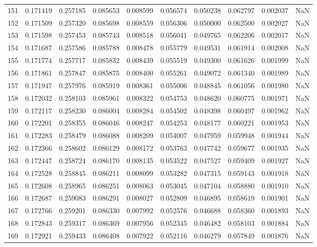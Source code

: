 \begin{tabular}{lrrrrrrrrr}
151 & 0.171419 & 0.257185 & 0.085653 & 0.008599 & 0.056574 & 0.050238 & 0.062797 & 0.002037 & NaN \\
152 & 0.171509 & 0.257320 & 0.085698 & 0.008559 & 0.056306 & 0.050000 & 0.062500 & 0.002027 & NaN \\
153 & 0.171598 & 0.257453 & 0.085743 & 0.008518 & 0.056041 & 0.049765 & 0.062206 & 0.002017 & NaN \\
154 & 0.171687 & 0.257586 & 0.085788 & 0.008478 & 0.055779 & 0.049531 & 0.061914 & 0.002008 & NaN \\
155 & 0.171774 & 0.257717 & 0.085832 & 0.008439 & 0.055519 & 0.049300 & 0.061626 & 0.001999 & NaN \\
156 & 0.171861 & 0.257847 & 0.085875 & 0.008400 & 0.055261 & 0.049072 & 0.061340 & 0.001989 & NaN \\
157 & 0.171947 & 0.257976 & 0.085919 & 0.008361 & 0.055006 & 0.048845 & 0.061056 & 0.001980 & NaN \\
158 & 0.172032 & 0.258103 & 0.085961 & 0.008322 & 0.054753 & 0.048620 & 0.060775 & 0.001971 & NaN \\
159 & 0.172117 & 0.258230 & 0.086004 & 0.008284 & 0.054502 & 0.048398 & 0.060497 & 0.001962 & NaN \\
160 & 0.172201 & 0.258355 & 0.086046 & 0.008247 & 0.054253 & 0.048177 & 0.060221 & 0.001953 & NaN \\
161 & 0.172283 & 0.258479 & 0.086088 & 0.008209 & 0.054007 & 0.047959 & 0.059948 & 0.001944 & NaN \\
162 & 0.172366 & 0.258602 & 0.086129 & 0.008172 & 0.053763 & 0.047742 & 0.059677 & 0.001935 & NaN \\
163 & 0.172447 & 0.258724 & 0.086170 & 0.008135 & 0.053522 & 0.047527 & 0.059409 & 0.001927 & NaN \\
164 & 0.172528 & 0.258845 & 0.086211 & 0.008099 & 0.053282 & 0.047315 & 0.059143 & 0.001918 & NaN \\
165 & 0.172608 & 0.258965 & 0.086251 & 0.008063 & 0.053045 & 0.047104 & 0.058880 & 0.001910 & NaN \\
166 & 0.172687 & 0.259083 & 0.086291 & 0.008027 & 0.052809 & 0.046895 & 0.058619 & 0.001901 & NaN \\
167 & 0.172766 & 0.259201 & 0.086330 & 0.007992 & 0.052576 & 0.046688 & 0.058360 & 0.001893 & NaN \\
168 & 0.172843 & 0.259317 & 0.086369 & 0.007956 & 0.052345 & 0.046482 & 0.058103 & 0.001884 & NaN \\
169 & 0.172921 & 0.259433 & 0.086408 & 0.007922 & 0.052116 & 0.046279 & 0.057849 & 0.001876 & NaN \\

\end{tabular}
